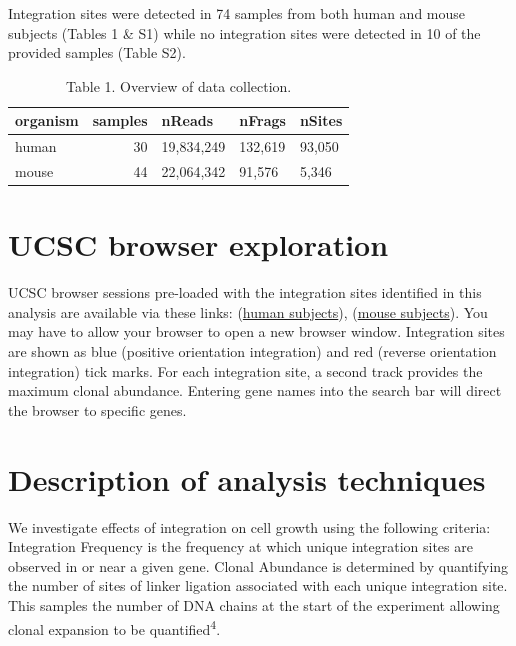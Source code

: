\documentclass[12pt,]{article}
\begin{document}
Integration sites were detected in 74 samples from both human and mouse
subjects (Tables 1 \& S1) while no integration sites were detected in 10
of the provided samples (Table S2).

\vspace{0.1cm}

\begin{table}[!h]

\caption{\label{tab:unnamed-chunk-2}Table 1. Overview of data collection.}
\centering
\begin{tabular}[t]{lrlll}
\toprule
organism & samples & nReads & nFrags & nSites\\
\midrule
human & 30 & 19,834,249 & 132,619 & 93,050\\
mouse & 44 & 22,064,342 & 91,576 & 5,346\\
\bottomrule
\end{tabular}
\end{table}

\vspace{0.1cm}

\section{UCSC browser exploration}\label{ucsc-browser-exploration}

UCSC browser sessions pre-loaded with the integration sites identified
in this analysis are available via these links:
(\href{http://genome.ucsc.edu/cgi-bin/hgTracks?org=human\&db=hg38\&hgt.customText=http://microb120.med.upenn.edu/UCSC/cherqui/UCSC_CYS_human.ucsc}{human
subjects}),
(\href{http://genome.ucsc.edu/cgi-bin/hgTracks?org=mouse\&db=mm9\&hgt.customText=http://microb120.med.upenn.edu/UCSC/cherqui/UCSC_CYS_mouse.ucsc}{mouse
subjects}). You may have to allow your browser to open a new browser
window. Integration sites are shown as blue (positive orientation
integration) and red (reverse orientation integration) tick marks. For
each integration site, a second track provides the maximum clonal
abundance. Entering gene names into the search bar will direct the
browser to specific genes.

\newpage

\section{Description of analysis
techniques}\label{description-of-analysis-techniques}

We investigate effects of integration on cell growth using the following
criteria: Integration Frequency is the frequency at which unique
integration sites are observed in or near a given gene. Clonal Abundance
is determined by quantifying the number of sites of linker ligation
associated with each unique integration site. This samples the number of
DNA chains at the start of the experiment allowing clonal expansion to
be quantified\textsuperscript{4}.
\end{document}
